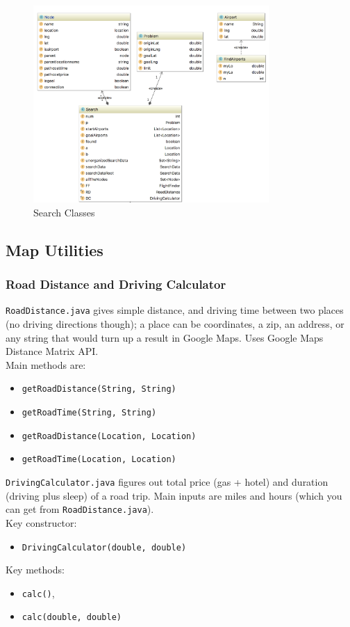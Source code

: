 \documentclass[11pt]{article}
\begin{document}
\begin{figure}[!ht]
  \centering
  \includegraphics[width=0.8\textwidth]{searchuml.png}
  \caption{Search Classes}
  \label{fig:suml}
\end{figure}

\pagebreak

\subsection{Map Utilities}

\subsubsection{Road Distance and Driving Calculator }

\texttt{RoadDistance.java} gives simple distance, and driving time between two places (no driving
directions though); a place can be coordinates, a zip, an address, or any string that would turn up a result in Google Maps. Uses Google Maps
Distance Matrix API. \\
Main methods are: 
\begin{itemize}
\item \texttt{getRoadDistance(String, String)}
\item \texttt{getRoadTime(String, String)}
\item \texttt{getRoadDistance(Location, Location)}
\item \texttt{getRoadTime(Location, Location)}
\end{itemize}

\texttt{DrivingCalculator.java} figures out total price (gas + hotel) and duration (driving plus sleep) of a road trip. Main inputs are miles and hours (which you can get from
 \texttt{RoadDistance.java}).\\
 Key constructor:
 \begin{itemize}
 \item  \texttt{DrivingCalculator(double, double)}
 \end{itemize}
  Key methods:
  \begin{itemize}
\item  \texttt{calc()},
 \item  \texttt{calc(double, double)}
 \end{itemize}
\end{document}
